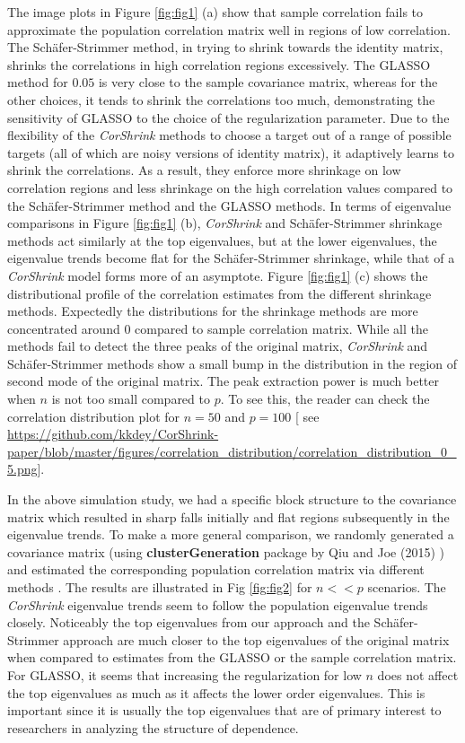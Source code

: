 The image plots in Figure \ref{fig:fig1} (a) show that sample correlation fails to approximate the population correlation matrix well in regions of low correlation. The Sch\"{a}fer-Strimmer method, in trying to shrink towards the identity matrix, shrinks the correlations in high correlation regions excessively. The GLASSO method for $0.05$ is very close to the sample covariance matrix, whereas for the other choices, it tends to shrink the correlations too much, demonstrating the sensitivity of GLASSO to the choice of the regularization parameter. Due to the flexibility of the \textit{CorShrink} methods to choose a  target out of a range of possible targets (all of which are noisy versions of identity matrix), it adaptively learns to shrink the correlations. As a result, they enforce more shrinkage on low correlation regions and less shrinkage on the high correlation values compared to the Sch\"{a}fer-Strimmer method and the GLASSO methods. In terms of eigenvalue comparisons in Figure \ref{fig:fig1} (b), \textit{CorShrink} and Sch\"{a}fer-Strimmer shrinkage methods act similarly at the top eigenvalues, but at the lower eigenvalues, the eigenvalue trends become flat for the Sch\"{a}fer-Strimmer shrinkage, while that of a \textit{CorShrink} model forms more of an asymptote. Figure \ref{fig:fig1} (c) shows the distributional profile of the correlation estimates from the different  shrinkage methods. Expectedly the distributions for the shrinkage methods are more concentrated around $0$ compared to sample correlation matrix. While all the methods fail to detect the three peaks of the original matrix, \textit{CorShrink} and Sch\"{a}fer-Strimmer methods show a small bump in the distribution in the region of second mode of the original matrix. The peak extraction power is much better when $n$ is not too small compared to $p$. To see this, the reader can check the correlation distribution plot for $n=50$ and $p=100$ [ see \url{https://github.com/kkdey/CorShrink-paper/blob/master/figures/correlation_distribution/correlation_distribution_0_5.png}]. 

In the above simulation study, we had a specific block structure to the covariance matrix which resulted in sharp falls initially and flat regions subsequently in the eigenvalue trends. To make a more general comparison, we randomly generated a covariance matrix (using \textbf{clusterGeneration} package by Qiu and Joe (2015) \cite{Qiu2015}) and estimated the corresponding population correlation matrix via different methods . The results are illustrated in Fig \ref{fig:fig2} for $n << p$ scenarios. The \textit{CorShrink} eigenvalue trends seem to follow the population eigenvalue trends closely. Noticeably the top eigenvalues from our approach and the Sch\"{a}fer-Strimmer approach are much closer to the top eigenvalues of the original matrix when compared to estimates from the GLASSO  or the sample correlation matrix. For GLASSO, it seems that increasing the regularization for low $n$ does not affect the top eigenvalues as much as it affects the lower order eigenvalues. This is important since it is usually the top eigenvalues that are of primary interest to researchers in analyzing the structure of dependence.

